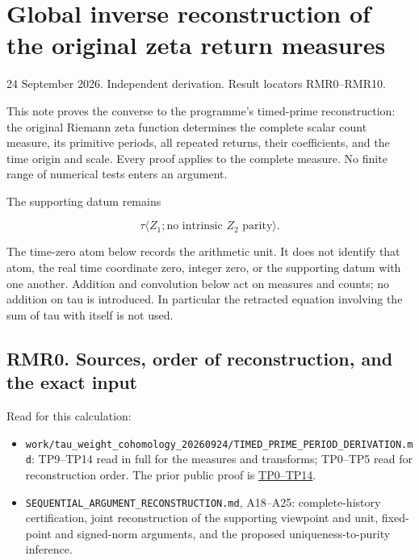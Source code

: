 \documentclass[
]{article}
\providecommand{\tightlist}{%
  \setlength{\itemsep}{0pt}\setlength{\parskip}{0pt}}
\begin{document}
\section{Global inverse reconstruction of the original zeta return
measures}\label{global-inverse-reconstruction-of-the-original-zeta-return-measures}

24 September 2026. Independent derivation. Result locators RMR0--RMR10.

This note proves the converse to the programme's timed-prime
reconstruction: the original Riemann zeta function determines the
complete scalar count measure, its primitive periods, all repeated
returns, their coefficients, and the time origin and scale. Every proof
applies to the complete measure. No finite range of numerical tests
enters an argument.

The supporting datum remains

\[
\tau\langle Z_1;\text{no intrinsic }Z_2\text{ parity}\rangle.
\]

The time-zero atom below records the arithmetic unit. It does not
identify that atom, the real time coordinate zero, integer zero, or the
supporting datum with one another. Addition and convolution below act on
measures and counts; no addition on tau is introduced. In particular the
retracted equation involving the sum of tau with itself is not used.

\subsection{RMR0. Sources, order of reconstruction, and the exact
input}\label{rmr0.-sources-order-of-reconstruction-and-the-exact-input}

Read for this calculation:

\begin{itemize}
\tightlist
\item
  \nolinkurl{work/tau_weight_cohomology_20260924/TIMED_PRIME_PERIOD_DERIVATION.md}:
  TP9--TP14 read in full for the measures and transforms; TP0--TP5 read
  for reconstruction order. The prior public proof is
  \href{https://github.com/KokunoYumeto/zeta-function-research-reader/blob/32acd0df89ae22c96d2bc30372e4426a31ce4506/workbenches/splitzero-tandem/temporary-arguments/20260924-fixed-generic-point-purity/timed-prime-reconstruction/README.md}{TP0--TP14}.
\item
  \nolinkurl{SEQUENTIAL_ARGUMENT_RECONSTRUCTION.md}, A18--A25:
  complete-history certification, joint reconstruction of the supporting
  viewpoint and unit, fixed-point and signed-norm arguments, and the
  proposed uniqueness-to-purity inference.
\end{itemize}
\end{document}
